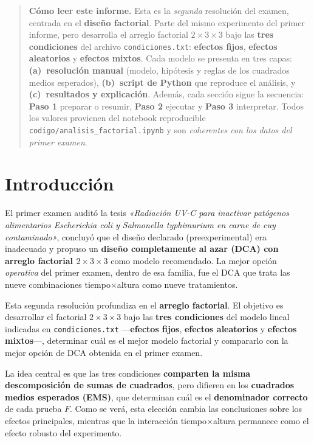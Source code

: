 \documentclass[12pt,a4paper]{article}
\begin{document}
\begin{quote}
\small \textbf{Cómo leer este informe.} Esta es la \emph{segunda} resolución del examen, centrada en el \textbf{diseño factorial}. Parte del mismo experimento del primer informe, pero desarrolla el arreglo factorial $2\times3\times3$ bajo las \textbf{tres condiciones} del archivo \texttt{condiciones.txt}: \textbf{efectos fijos}, \textbf{efectos aleatorios} y \textbf{efectos mixtos}. Cada modelo se presenta en tres capas: \textbf{(a)~resolución manual} (modelo, hipótesis y reglas de los cuadrados medios esperados), \textbf{(b)~script de Python} que reproduce el análisis, y \textbf{(c)~resultados y explicación}. Además, cada sección sigue la secuencia: \textbf{Paso 1} preparar o resumir, \textbf{Paso 2} ejecutar y \textbf{Paso 3} interpretar. Todos los valores provienen del notebook reproducible \texttt{codigo/analisis\_factorial.ipynb} y son \emph{coherentes con los datos del primer examen}.
\end{quote}

\newpage
\tableofcontents
\newpage

\section{Introducción}

El primer examen auditó la tesis \textit{«Radiación UV-C para inactivar patógenos alimentarios \textit{Escherichia coli} y \textit{Salmonella typhimurium} en carne de cuy contaminado»}, concluyó que el diseño declarado (preexperimental) era inadecuado y propuso un \textbf{diseño completamente al azar (DCA) con arreglo factorial $2\times3\times3$} como modelo recomendado. La mejor opción \emph{operativa} del primer examen, dentro de esa familia, fue el DCA que trata las nueve combinaciones tiempo$\times$altura como nueve tratamientos.

Esta segunda resolución profundiza en el \textbf{arreglo factorial}. El objetivo es desarrollar el factorial $2\times3\times3$ bajo las \textbf{tres condiciones} del modelo lineal indicadas en \texttt{condiciones.txt} ---\textbf{efectos fijos}, \textbf{efectos aleatorios} y \textbf{efectos mixtos}---, determinar cuál es el mejor modelo factorial y compararlo con la mejor opción de DCA obtenida en el primer examen.

La idea central es que las tres condiciones \textbf{comparten la misma descomposición de sumas de cuadrados}, pero difieren en los \textbf{cuadrados medios esperados (EMS)}, que determinan cuál es el \textbf{denominador correcto} de cada prueba $F$. Como se verá, esta elección cambia las conclusiones sobre los efectos principales, mientras que la interacción tiempo$\times$altura permanece como el efecto robusto del experimento.
\end{document}
